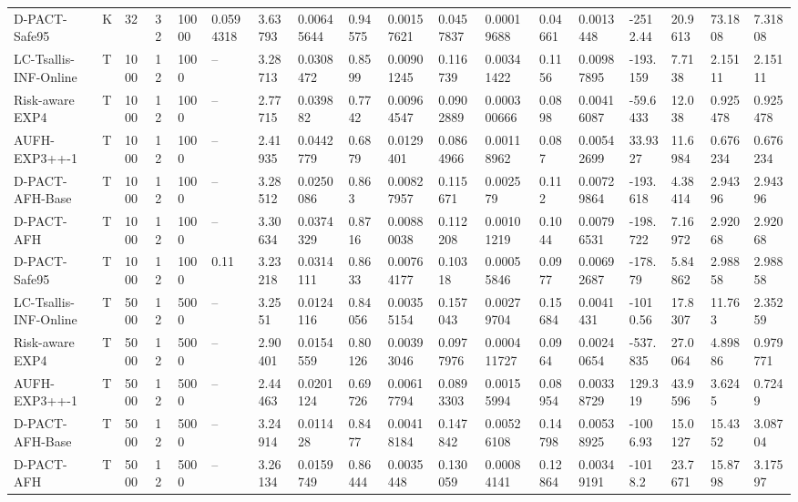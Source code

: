 \begin{tabular}{llllllllllllllllll}
D-PACT-Safe95 & K & 32 & 32 & 10000 & 0.0594318 & 3.63793 & 0.00645644 & 0.94575 & 0.00157621 & 0.0457837 & 0.00019688 & 0.04661 & 0.0013448 & -2512.44 & 20.9613 & 73.1808 & 7.31808 \\ 
LC-Tsallis-INF-Online & T & 1000 & 12 & 1000 & -- & 3.28713 & 0.0308472 & 0.8599 & 0.00901245 & 0.116739 & 0.00341422 & 0.1156 & 0.00987895 & -193.159 & 7.7138 & 2.15111 & 2.15111 \\ 
Risk-aware EXP4 & T & 1000 & 12 & 1000 & -- & 2.77715 & 0.039882 & 0.7742 & 0.00964547 & 0.0902889 & 0.000300666 & 0.0898 & 0.00416087 & -59.6433 & 12.038 & 0.925478 & 0.925478 \\ 
AUFH-EXP3++-1 & T & 1000 & 12 & 1000 & -- & 2.41935 & 0.0442779 & 0.6879 & 0.0129401 & 0.0864966 & 0.00118962 & 0.087 & 0.00542699 & 33.9327 & 11.6984 & 0.676234 & 0.676234 \\ 
D-PACT-AFH-Base & T & 1000 & 12 & 1000 & -- & 3.28512 & 0.0250086 & 0.863 & 0.00827957 & 0.115671 & 0.002579 & 0.112 & 0.00729864 & -193.618 & 4.38414 & 2.94396 & 2.94396 \\ 
D-PACT-AFH & T & 1000 & 12 & 1000 & -- & 3.30634 & 0.0374329 & 0.8716 & 0.00880038 & 0.112208 & 0.00101219 & 0.1044 & 0.00796531 & -198.722 & 7.16972 & 2.92068 & 2.92068 \\ 
D-PACT-Safe95 & T & 1000 & 12 & 1000 & 0.11 & 3.23218 & 0.0314111 & 0.8633 & 0.00764177 & 0.10318 & 0.00055846 & 0.0977 & 0.00692687 & -178.79 & 5.84862 & 2.98858 & 2.98858 \\ 
LC-Tsallis-INF-Online & T & 5000 & 12 & 5000 & -- & 3.2551 & 0.0124116 & 0.84056 & 0.00355154 & 0.157043 & 0.00279704 & 0.15684 & 0.0041431 & -1010.56 & 17.8307 & 11.763 & 2.35259 \\ 
Risk-aware EXP4 & T & 5000 & 12 & 5000 & -- & 2.90401 & 0.0154559 & 0.80126 & 0.00393046 & 0.0977976 & 0.000411727 & 0.0964 & 0.00240654 & -537.835 & 27.0064 & 4.89886 & 0.979771 \\ 
AUFH-EXP3++-1 & T & 5000 & 12 & 5000 & -- & 2.44463 & 0.0201124 & 0.69726 & 0.00617794 & 0.0893303 & 0.00155994 & 0.08954 & 0.00338729 & 129.319 & 43.9596 & 3.6245 & 0.7249 \\ 
D-PACT-AFH-Base & T & 5000 & 12 & 5000 & -- & 3.24914 & 0.011428 & 0.8477 & 0.00418184 & 0.147842 & 0.00526108 & 0.14798 & 0.00538925 & -1006.93 & 15.0127 & 15.4352 & 3.08704 \\ 
D-PACT-AFH & T & 5000 & 12 & 5000 & -- & 3.26134 & 0.0159749 & 0.86444 & 0.0035448 & 0.130059 & 0.00084141 & 0.12864 & 0.00349191 & -1018.2 & 23.7671 & 15.8798 & 3.17597 \\ 

\end{tabular}
